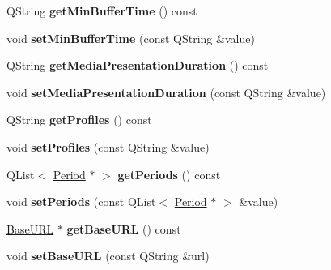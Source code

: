 \begin{DoxyCompactItemize}
\item 
\hypertarget{class_m_p_d_ac61b91a39916cbf245ea6cab51201bf4}{Q\-String {\bfseries get\-Min\-Buffer\-Time} () const }\label{class_m_p_d_ac61b91a39916cbf245ea6cab51201bf4}

\item 
\hypertarget{class_m_p_d_a0d0d16afaf031b12cd3db8267e3765ef}{void {\bfseries set\-Min\-Buffer\-Time} (const Q\-String \&value)}\label{class_m_p_d_a0d0d16afaf031b12cd3db8267e3765ef}

\item 
\hypertarget{class_m_p_d_ac039a05b52ae45e39fc84543595bba96}{Q\-String {\bfseries get\-Media\-Presentation\-Duration} () const }\label{class_m_p_d_ac039a05b52ae45e39fc84543595bba96}

\item 
\hypertarget{class_m_p_d_a2b24d6f7bcf7ba92b5056f71b77247ea}{void {\bfseries set\-Media\-Presentation\-Duration} (const Q\-String \&value)}\label{class_m_p_d_a2b24d6f7bcf7ba92b5056f71b77247ea}

\item 
\hypertarget{class_m_p_d_afb4b801c75e2ae965ffc1ca10fef8f4a}{Q\-String {\bfseries get\-Profiles} () const }\label{class_m_p_d_afb4b801c75e2ae965ffc1ca10fef8f4a}

\item 
\hypertarget{class_m_p_d_a9a38f0851e320fe5142389919712fc6a}{void {\bfseries set\-Profiles} (const Q\-String \&value)}\label{class_m_p_d_a9a38f0851e320fe5142389919712fc6a}

\item 
\hypertarget{class_m_p_d_aec048be38c5d0a748d5f467485f0bd2a}{Q\-List$<$ \hyperlink{class_period}{Period} $\ast$ $>$ {\bfseries get\-Periods} () const }\label{class_m_p_d_aec048be38c5d0a748d5f467485f0bd2a}

\item 
\hypertarget{class_m_p_d_a0f3a3f95fdb879bda0c8660d51a24049}{void {\bfseries set\-Periods} (const Q\-List$<$ \hyperlink{class_period}{Period} $\ast$ $>$ \&value)}\label{class_m_p_d_a0f3a3f95fdb879bda0c8660d51a24049}

\item 
\hypertarget{class_m_p_d_a46a1e484ee025e82443efee595c1b4d6}{\hyperlink{class_base_u_r_l}{Base\-U\-R\-L} $\ast$ {\bfseries get\-Base\-U\-R\-L} () const }\label{class_m_p_d_a46a1e484ee025e82443efee595c1b4d6}

\item 
\hypertarget{class_m_p_d_a0b679407ec7578f214132615aff29acb}{void {\bfseries set\-Base\-U\-R\-L} (const Q\-String \&url)}\label{class_m_p_d_a0b679407ec7578f214132615aff29acb}

\end{DoxyCompactItemize}


